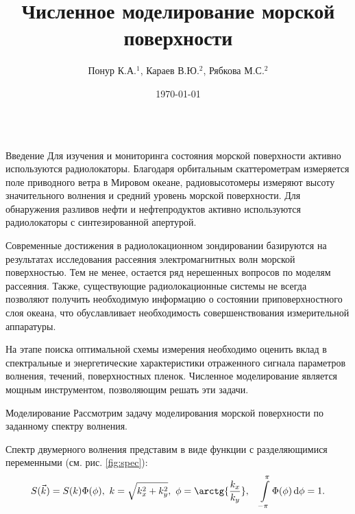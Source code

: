 
\title{Численное моделирование морской поверхности}
\author{Понур К.А.$^{1}$, Караев В.Ю.$^2$, Рябкова М.С.$^2$}
\date{\today}
\newcommand{\tM}{\widetilde{M}}
\usepackage{mathtools}
\newcommand{\mean}[1]{\langle #1 \rangle}

  \begin{frame}[t]{} 
    \begin{columns}[t]
      \begin{column}{.48\linewidth}
        \begin{block}{Введение}
            Для изучения и мониторинга состояния морской поверхности активно используются радиолокаторы. 
            Благодаря орбитальным скаттерометрам измеряется поле приводного ветра в Мировом океане, радиовысотомеры измеряют высоту значительного волнения и средний уровень
            морской поверхности. Для обнаружения разливов нефти и нефтепродуктов активно используются радиолокаторы с синтезированной апертурой.

            Современные достижения в радиолокационном зондировании базируются на результатах исследования рассеяния электромагнитных волн морской поверхностью. Тем не менее, остается ряд нерешенных 
            вопросов по моделям рассеяния. Также, существующие радиолокационные системы не всегда позволяют получить необходимую информацию о состоянии приповерхностного слоя океана, что обуславливает необходимость совершенствования измерительной аппаратуры. 

            На этапе поиска оптимальной схемы измерения необходимо оценить вклад в спектральные и энергетические характеристики отраженного сигнала параметров волнения, течений, поверхностных пленок. Численное моделирование является мощным инструментом, позволяющим решать эти задачи.
        \end{block}
        \begin{block}{Моделирование}
            Рассмотрим задачу моделирования морской поверхности по заданному спектру волнения.

            Спектр двумерного волнения представим в виде функции с разделяющимися переменными (см. рис. \ref{fig:spec}):
        \begin{equation}
            \label{eq:}
            S(\vec k) = S(k) \Phi(\phi), ~ k = \sqrt{k_x^2+k_y^2},~ \phi=\arctg{\frac{k_x}{k_y}},\quad \int\limits_{-\pi}^{\pi} \Phi(\phi) \dd{\phi} = 1.
        \end{equation}
        

\end{block}
\end{column}
\end{columns}
\end{frame}
